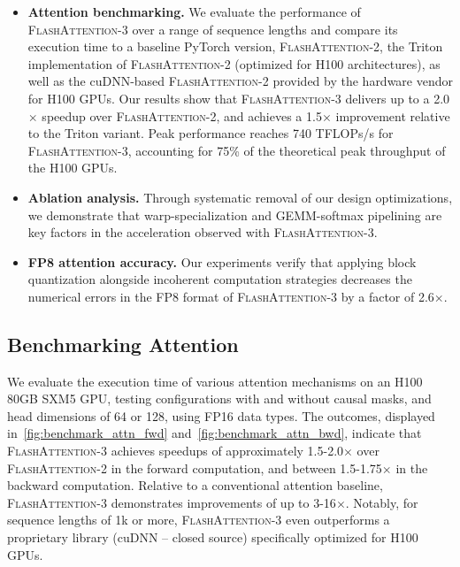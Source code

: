 \begin{enumerate}
\begin{itemize}

\item \textbf{Attention benchmarking.} We evaluate the performance of \textsc{FlashAttention-3} over a range of sequence lengths and compare its execution time to a baseline PyTorch version, \textsc{FlashAttention-2}, the Triton implementation of \textsc{FlashAttention-2} (optimized for H100 architectures), as well as the cuDNN-based \textsc{FlashAttention-2} provided by the hardware vendor for H100 GPUs. Our results show that \textsc{FlashAttention-3} delivers up to a 2.0$\times$ speedup over \textsc{FlashAttention-2}, and achieves a 1.5$\times$ improvement relative to the Triton variant. Peak performance reaches 740 TFLOPs/s for \textsc{FlashAttention-3}, accounting for 75\% of the theoretical peak throughput of the H100 GPUs.

\item \textbf{Ablation analysis.} Through systematic removal of our design optimizations, we demonstrate that warp-specialization and GEMM-softmax pipelining are key factors in the acceleration observed with \textsc{FlashAttention-3}.

\item \textbf{FP8 attention accuracy.} Our experiments verify that applying block quantization alongside incoherent computation strategies decreases the numerical errors in the FP8 format of \textsc{FlashAttention-3} by a factor of 2.6$\times$.
\end{itemize}

\subsection{Benchmarking Attention}
\label{subsec:benchmark_attn}

We evaluate the execution time of various attention mechanisms on an H100 80GB SXM5 GPU, testing configurations with and without causal masks, and head dimensions of 64 or 128, using FP16 data types. The outcomes, displayed in~\cref{fig:benchmark_attn_fwd} and~\cref{fig:benchmark_attn_bwd}, indicate that \textsc{FlashAttention-3} achieves speedups of approximately 1.5-2.0$\times$ over \textsc{FlashAttention-2} in the forward computation, and between 1.5-1.75$\times$ in the backward computation. Relative to a conventional attention baseline, \textsc{FlashAttention-3} demonstrates improvements of up to 3-16$\times$. Notably, for sequence lengths of 1k or more, \textsc{FlashAttention-3} even outperforms a proprietary library (cuDNN -- closed source) specifically optimized for H100 GPUs.


\end{enumerate}

